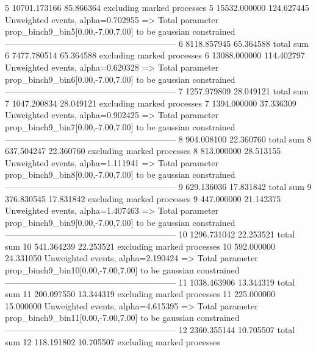 5          10701.173166    85.866364       excluding marked processes    
5          15532.000000    124.627445      Unweighted events, alpha=0.702955
  => Total parameter prop_binch9_bin5[0.00,-7.00,7.00] to be gaussian constrained
------------------------------------------------------------
6          8118.857945     65.364588       total sum                     
6          7477.780514     65.364588       excluding marked processes    
6          13088.000000    114.402797      Unweighted events, alpha=0.620328
  => Total parameter prop_binch9_bin6[0.00,-7.00,7.00] to be gaussian constrained
------------------------------------------------------------
7          1257.979809     28.049121       total sum                     
7          1047.200834     28.049121       excluding marked processes    
7          1394.000000     37.336309       Unweighted events, alpha=0.902425
  => Total parameter prop_binch9_bin7[0.00,-7.00,7.00] to be gaussian constrained
------------------------------------------------------------
8          904.008100      22.360760       total sum                     
8          637.504247      22.360760       excluding marked processes    
8          813.000000      28.513155       Unweighted events, alpha=1.111941
  => Total parameter prop_binch9_bin8[0.00,-7.00,7.00] to be gaussian constrained
------------------------------------------------------------
9          629.136036      17.831842       total sum                     
9          376.830545      17.831842       excluding marked processes    
9          447.000000      21.142375       Unweighted events, alpha=1.407463
  => Total parameter prop_binch9_bin9[0.00,-7.00,7.00] to be gaussian constrained
------------------------------------------------------------
10         1296.731042     22.253521       total sum                     
10         541.364239      22.253521       excluding marked processes    
10         592.000000      24.331050       Unweighted events, alpha=2.190424
  => Total parameter prop_binch9_bin10[0.00,-7.00,7.00] to be gaussian constrained
------------------------------------------------------------
11         1038.463906     13.344319       total sum                     
11         200.097550      13.344319       excluding marked processes    
11         225.000000      15.000000       Unweighted events, alpha=4.615395
  => Total parameter prop_binch9_bin11[0.00,-7.00,7.00] to be gaussian constrained
------------------------------------------------------------
12         2360.355144     10.705507       total sum                     
12         118.191802      10.705507       excluding marked processes    
